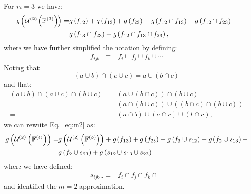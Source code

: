 \documentclass[11pt]{article}
\newcommand{\gxn}[1]{g\left(#1\right)}
\newcommand{\gapprox}[1]{g\left(#1\right)}
\begin{document}
For $m=3$ we have:
\begin{align}
	\gapprox{\unionset{2}{3}} =&
      \gxn{\Di} + \gxn{\Dj} + \gxn{\Dk} - \gxn{\IDiDj} -
	                 \gxn{\IDiDk} -\nonumber\\
	               & \gxn{\IDjDk} + \gxn{\IDiDjDk}\label{eq:m2},
\end{align}
where we have further simplified the notation by defining:
\begin{align}
	f_{ijk\cdots} \equiv& f_i\cup f_j\cup f_k \cup \cdots
\end{align}
Noting that:
\begin{equation}
    \left(a\cup b\right) \cap \left(a\cup c\right) = a\cup \left(b\cap c\right)
\end{equation}
and that:
\begin{align}
	\left(a\cup b\right)\cap\left(a\cup c\right)\cap\left(b\cup c\right) =&
	\left(a\cup\left(b\cap c\right)\right)\cap\left(b \cup c\right) \nonumber\\
	=&
	\left(a\cap\left(b\cup c\right)\right)\cup
	\left(\left(b\cap c\right)\cap\left(b\cup c\right)\right)\nonumber\\
		=&
	\left(a\cap b\right)\cup \left(a\cap c\right)\cup \left(b\cap c\right),
\end{align}
we can rewrite Eq.~\eqref{eq:m2} as:
\begin{align}
	\gapprox{\unionset{2}{3}} =& \gapprox{\unionset{2}{3}} + \gxn{\Dj} + \gxn{\Dk} -
	                 \gxn{f_3 \cup \Ii} -
	                 \gxn{f_2 \cup \Ij} -\nonumber\\
	               & \gxn{f_2 \cup \Ik} +
	                 \gxn{\Ii\cup \Ij\cup \Ik}
\end{align}
where we have defined:
\begin{align}
	s_{ijk\cdots} \equiv& f_i\cap f_j\cap f_k \cap \cdots
\end{align}
and identified the $m=2$ approximation.
\end{document}
